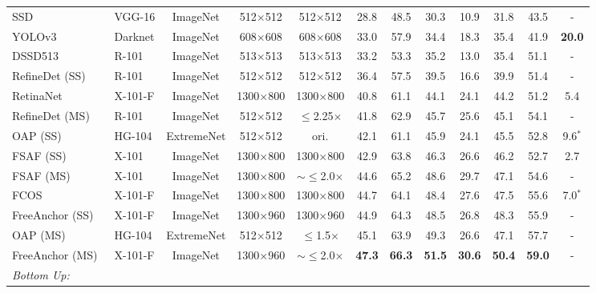 \documentclass[runningheads]{llncs}
\begin{document}
\begin{table}[H]
{\begin{tabular}{llcccccccccc}
SSD~\cite{ssd}         & VGG-16                 &  ImageNet & 512$\times$512 & 512$\times$512 & 28.8 & 48.5 & 30.3 & 10.9 & 31.8 & 43.5         & -\\
YOLOv3~\cite{yolo3}        & Darknet                  &  ImageNet & 608$\times$608 & 608$\times$608& 33.0 & 57.9 &  34.4 & 18.3 &  35.4 & 41.9         & \textbf{20.0}\\
DSSD513~\cite{dssd} & R-101         &  ImageNet & 513$\times$513 & 513$\times$513& 33.2& 53.3 & 35.2 & 13.0 & 35.4 &51.1        & -\\ 
RefineDet (SS)~\cite{refinedet} & R-101 & ImageNet & 512$\times$512 & 512$\times$512&  36.4 & 57.5 & 39.5 & 16.6 & 39.9 & 51.4 & - \\
RetinaNet~\cite{retinanet} & X-101-F & ImageNet & 1300$\times$800 & 1300$\times$800 & 40.8 & 61.1 & 44.1 & 24.1 & 44.2 & 51.2 & 5.4\\
RefineDet (MS)~\cite{refinedet} & R-101 & ImageNet & 512$\times$512 & $\leq$2.25$\times$ & 41.8 & 62.9 & 45.7 &  25.6 & 45.1 & 54.1 & - \\
OAP (SS)~\cite{centernet} & HG-104 & ExtremeNet &  512$\times$512 & ori. & 42.1 & 61.1 & 45.9 &  24.1 & 45.5 & 52.8 & 9.6$^*$ \\
FSAF (SS)~\cite{fsaf} & X-101 & ImageNet & 1300$\times$800 & 1300$\times$800 &   42.9  &  63.8 &  46.3 &  26.6 &  46.2  &  52.7 &  2.7 \\
FSAF (MS)~\cite{fsaf} & X-101 & ImageNet &  1300$\times$800 & $\sim\leq$2.0$\times$ &   44.6 &  65.2 &  48.6 &  29.7 &  47.1  &  54.6 &  - \\
FCOS~\cite{fcos}  & X-101-F  & ImageNet &  1300$\times$800 & 1300$\times$800 & 44.7 & 64.1 &  48.4 &  27.6 &  47.5 &    55.6 & 7.0$^*$ \\
FreeAnchor (SS)~\cite{freeanchor} & X-101-F & ImageNet &  1300$\times$960 & 1300$\times$960 & 44.9 & 64.3 & 48.5 & 26.8 & 48.3 & 55.9 & - \\
OAP (MS)~\cite{centernet} & HG-104 & ExtremeNet &  512$\times$512 & $\leq$1.5$\times$ & 45.1 & 63.9 & 49.3 &  26.6 & 47.1 & 57.7  & - \\
FreeAnchor (MS)~\cite{freeanchor} & X-101-F & ImageNet &   1300$\times$960 & $\sim\leq$2.0$\times$& \textbf{47.3} &   \textbf{66.3} &  \textbf{51.5} &   \textbf{30.6} & \textbf{50.4} &  \textbf{59.0} & - \\


\textit{Bottom Up:} & & & & & & & &&&& \\



\end{tabular}}
\end{table}
\end{document}
